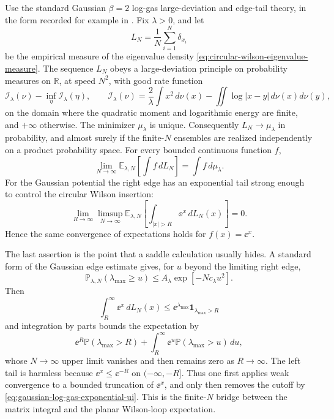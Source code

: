 \begin{quotedtheorem}
\label{qt:gaussian-log-gas-exponential-insertion}
Use the standard Gaussian \(\beta=2\) log-gas large-deviation and edge-tail
theory, in the form recorded for example in
\cite{BenArousGuionnet1997,AndersonGuionnetZeitouni2010}.
Fix \(\lambda>0\), and let
\[
  L_N=\frac1N\sum_{i=1}^N\delta_{x_i}
\]
be the empirical measure of the eigenvalue density
\eqref{eq:circular-wilson-eigenvalue-measure}.  The sequence \(L_N\) obeys a
large-deviation principle on probability measures on \(\mathbb R\), at speed
\(N^2\), with good rate function
\[
  \mathcal I_\lambda(\nu)-\inf_\eta\mathcal I_\lambda(\eta),
  \qquad
  \mathcal I_\lambda(\nu)
  =
  \frac{2}{\lambda}\int x^2\,d\nu(x)
  -
  \iint\log|x-y|\,d\nu(x)d\nu(y),
\]
on the domain where the quadratic moment and logarithmic energy are finite,
and \(+\infty\) otherwise.  The minimizer \(\mu_\lambda\) is unique.
Consequently \(L_N\to\mu_\lambda\) in probability, and almost surely if the
finite-\(N\) ensembles are realized independently on a product probability
space.  For every bounded continuous function \(f\),
\[
  \lim_{N\to\infty}
  \mathbb E_{\lambda,N}\!\left[\int f\,dL_N\right]
  =
  \int f\,d\mu_\lambda .
\]
For the Gaussian potential the right edge has an exponential tail strong
enough to control the circular Wilson insertion:
\begin{equation}
  \lim_{R\to\infty}\limsup_{N\to\infty}
  \mathbb E_{\lambda,N}\!\left[
    \int_{|x|>R}\ee^x\,dL_N(x)
  \right]
  =
  0.
  \label{eq:gaussian-log-gas-exponential-ui}
\end{equation}
Hence the same convergence of expectations holds for \(f(x)=\ee^x\).
\end{quotedtheorem}

The last assertion is the point that a saddle calculation usually hides.  A
standard form of the Gaussian edge estimate gives, for \(u\) beyond the
limiting right edge,
\[
  \mathbb P_{\lambda,N}(\lambda_{\max}\ge u)
  \le
  A_\lambda\exp[-N c_\lambda u^2].
\]
Then
\[
  \int_R^\infty \ee^x\,dL_N(x)
  \le
  \ee^{\lambda_{\max}}\mathbf 1_{\lambda_{\max}>R}
\]
and integration by parts bounds the expectation by
\[
  \ee^R\mathbb P(\lambda_{\max}>R)
  +
  \int_R^\infty \ee^u\mathbb P(\lambda_{\max}>u)\,du ,
\]
whose \(N\to\infty\) upper limit vanishes and then remains zero as
\(R\to\infty\).  The left tail is harmless because \(\ee^x\le \ee^{-R}\) on
\((-\infty,-R]\).  Thus one first applies weak convergence to a bounded
truncation of \(\ee^x\), and only then removes the cutoff by
\eqref{eq:gaussian-log-gas-exponential-ui}.  This is the finite-\(N\) bridge
between the matrix integral and the planar Wilson-loop expectation.

